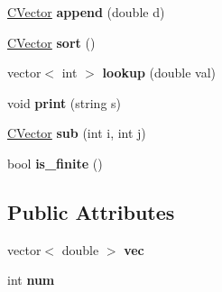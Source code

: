 \begin{DoxyCompactItemize}
\hyperlink{class_c_vector}{C\+Vector} {\bfseries append} (double d)
\item 
\mbox{\label{class_c_vector_a08a6ed57a7cb70e4738971b41b523a1e}} 
\hyperlink{class_c_vector}{C\+Vector} {\bfseries sort} ()
\item 
\mbox{\label{class_c_vector_a55ac92f8b7be959cc4b89cd19e7abe7a}} 
vector$<$ int $>$ {\bfseries lookup} (double val)
\item 
\mbox{\label{class_c_vector_a6526829bfd5fcfbf83101610b43ec11d}} 
void {\bfseries print} (string s)
\item 
\mbox{\label{class_c_vector_aa2b64d68f528bc36354d936e98227cbd}} 
\hyperlink{class_c_vector}{C\+Vector} {\bfseries sub} (int i, int j)
\item 
\mbox{\label{class_c_vector_a02f0694d2a445e4cf8d67eae7984b3ca}} 
bool {\bfseries is\+\_\+finite} ()
\end{DoxyCompactItemize}
\subsection*{Public Attributes}
\begin{DoxyCompactItemize}
\item 
\mbox{\label{class_c_vector_a941ec47064eaecfe390bddff2cc82982}} 
vector$<$ double $>$ {\bfseries vec}
\item 
\mbox{\label{class_c_vector_ae9ed687ba506de789fab04fd31fcda06}} 
int {\bfseries num}
\end{DoxyCompactItemize}

